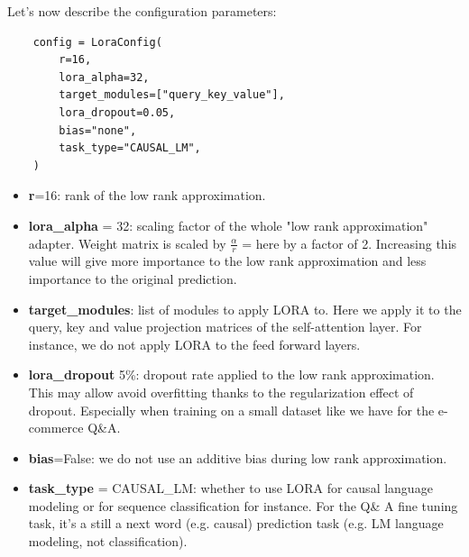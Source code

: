 \documentclass[a4paper]{article}
\begin{document}
Let's now describe the configuration parameters:
\begin{verbatim}
    config = LoraConfig(
        r=16,
        lora_alpha=32,
        target_modules=["query_key_value"],
        lora_dropout=0.05,
        bias="none",
        task_type="CAUSAL_LM",
    )
\end{verbatim}
\begin{itemize}
    \item \textbf{r}=16: rank of the low rank approximation. 
    \item \textbf{lora\_alpha} = 32: scaling factor of the whole "low rank approximation" adapter. 
    Weight matrix is scaled by $\frac{\alpha}{r}$ = here by a factor of 2.
    Increasing this value will give more importance to the low rank approximation and less importance to the original prediction.
    \item \textbf{target\_modules}: list of modules to apply LORA to.
    Here we apply it to the query, key and value projection matrices of the self-attention layer.
    For instance, we do not apply LORA to the feed forward layers.
    \item \textbf{lora\_dropout} 5\%: dropout rate applied to the low rank approximation. 
    This may allow avoid overfitting thanks to the regularization effect of dropout. 
    Especially when training on a small dataset like we have for the e-commerce Q\&A.
    \item \textbf{bias}=False: we do not use an additive bias during low rank approximation.
    \item \textbf{task\_type} = CAUSAL\_LM: whether to use LORA for causal language modeling or for sequence classification for instance.
    For the Q\& A fine tuning task, it's a still a next word (e.g. causal) prediction task (e.g. LM language modeling, not classification).
\end{itemize}


\end{document}
